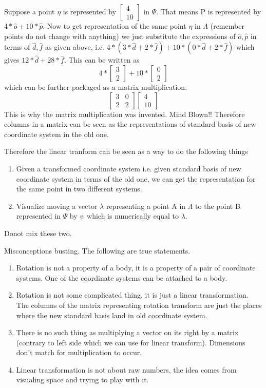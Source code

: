 \documentclass[../main.tex]{subfiles}
\begin{document}
{Suppose a point $ \eta $ is represented by $ \begin{bmatrix} 4 \\ 10 \end{bmatrix} $ in $ \Psi $.
That means P is represented by $ 4 * \hat{o} + 10 * \hat{p} $.
Now to get representation of the same point $ \eta $ in $ \Lambda $ (remember points do not change with anything) we just substitute the expressions of $ \hat{o}, \hat{p} $ in terms of $ \hat{d}, \hat{f} $ as given above, i.e. $ 4 * (3 * \hat{d} + 2 * \hat{f}) + 10 * (0 * \hat{d} + 2 * \hat{f}) $ which gives $ 12 * \hat{d} + 28 * \hat{f} $.
This can be written as
\[
  4 * \begin{bmatrix} 3 \\ 2 \end{bmatrix} + 10 * \begin{bmatrix} 0 \\ 2 \end{bmatrix}
\]
which can be further packaged as a matrix multiplication.
\[
  \begin{bmatrix} 3 & 0 \\ 2 & 2 \end{bmatrix} \begin{bmatrix} 4 \\ 10 \end{bmatrix}
\]
This is why the matrix multiplication was invented. Mind Blown!!
Therefore columns in a matrix can be seen as the representations of standard basis of new coordinate system in the old one.

Therefore the linear tranform can be seen as a way to do the following things
\begin{enumerate}[nolistsep]
  \item Given a transformed coordinate system i.e. given standard basis of new coordinate system in terms of the old one, we can get the representation for the same point in two different systems.
  \item Visualize moving a vector $ \lambda $ representing a point A in $ \Lambda $ to the point B represented in $ \Psi $ by $ \psi $ which is numerically equal to $ \lambda $.
\end{enumerate}
Donot mix these two.

Misconceptions busting. The following are true statements.
\begin{enumerate}[nolistsep]
  \item Rotation is not a property of a body, it is a property of a pair of coordinate systems. One of the coordinate systems can be attached to a body.
  \item Rotation is not some complicated thing, it is just a linear transformation. The columns of the matrix representing rotation transform are just the places where the new standard basis land in old coordinate system.
  \item There is no such thing as multiplying a vector on its right by a matrix (contrary to left side which we can use for linear transform). Dimensions don't match for multiplication to occur.
  \item Linear transformation is not about raw numbers, the idea comes from visualing space and trying to play with it.
\end{enumerate}


}
\end{document}
